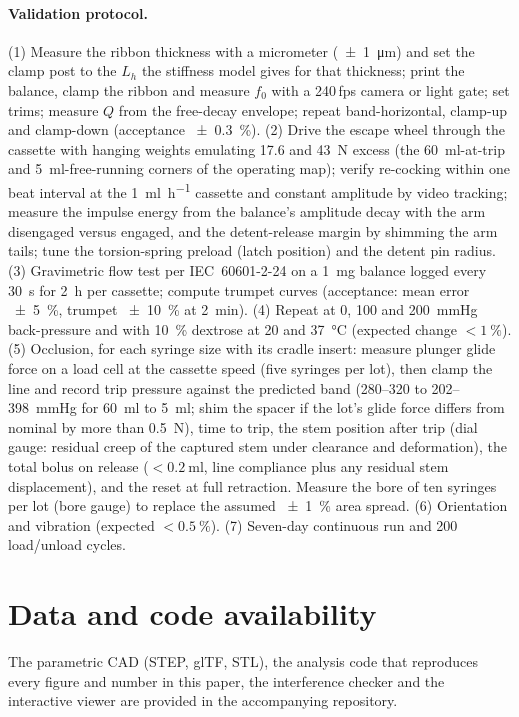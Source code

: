 \documentclass[11pt,a4paper]{article}
\begin{document}
\paragraph{Validation protocol.} (1) Measure the ribbon thickness with a micrometer (\SI{\pm 1}{\micro\metre}) and set the clamp post to the $L_h$ the stiffness model gives for that thickness; print the balance, clamp the ribbon and measure $f_0$ with a 240\,fps camera or light gate; set trims; measure $Q$ from the free-decay envelope; repeat band-horizontal, clamp-up and clamp-down (acceptance \SI{\pm 0.3}{\percent}). (2) Drive the escape wheel through the cassette with hanging weights emulating 17.6 and \SI{43}{\newton} excess (the \SI{60}{\milli\litre}-at-trip and \SI{5}{\milli\litre}-free-running corners of the operating map); verify re-cocking within one beat interval at the \SI{1}{\milli\litre\per\hour} cassette and constant amplitude by video tracking; measure the impulse energy from the balance's amplitude decay with the arm disengaged versus engaged, and the detent-release margin by shimming the arm tails; tune the torsion-spring preload (latch position) and the detent pin radius. (3) Gravimetric flow test per IEC~60601-2-24 on a \SI{1}{\milli\gram} balance logged every \SI{30}{\second} for \SI{2}{\hour} per cassette; compute trumpet curves (acceptance: mean error \SI{\pm 5}{\percent}, trumpet \SI{\pm 10}{\percent} at \SI{2}{\minute}). (4) Repeat at 0, 100 and \SI{200}{mmHg} back-pressure and with \SI{10}{\percent} dextrose at 20 and \SI{37}{\celsius} (expected change $<\SI{1}{\percent}$). (5) Occlusion, for each syringe size with its cradle insert: measure plunger glide force on a load cell at the cassette speed (five syringes per lot), then clamp the line and record trip pressure against the predicted band (280--320 to 202--\SI{398}{mmHg} for \SI{60}{\milli\litre} to \SI{5}{\milli\litre}; shim the spacer if the lot's glide force differs from nominal by more than \SI{0.5}{\newton}), time to trip, the stem position after trip (dial gauge: residual creep of the captured stem under clearance and deformation), the total bolus on release ($<\SI{0.2}{\milli\litre}$, line compliance plus any residual stem displacement), and the reset at full retraction. Measure the bore of ten syringes per lot (bore gauge) to replace the assumed \SI{\pm 1}{\percent} area spread. (6) Orientation and vibration (expected $<\SI{0.5}{\percent}$). (7) Seven-day continuous run and 200 load/unload cycles.

\section*{Data and code availability}
The parametric CAD (STEP, glTF, STL), the analysis code that reproduces every figure and number in this paper, the interference checker and the interactive viewer are provided in the accompanying repository.
\end{document}
